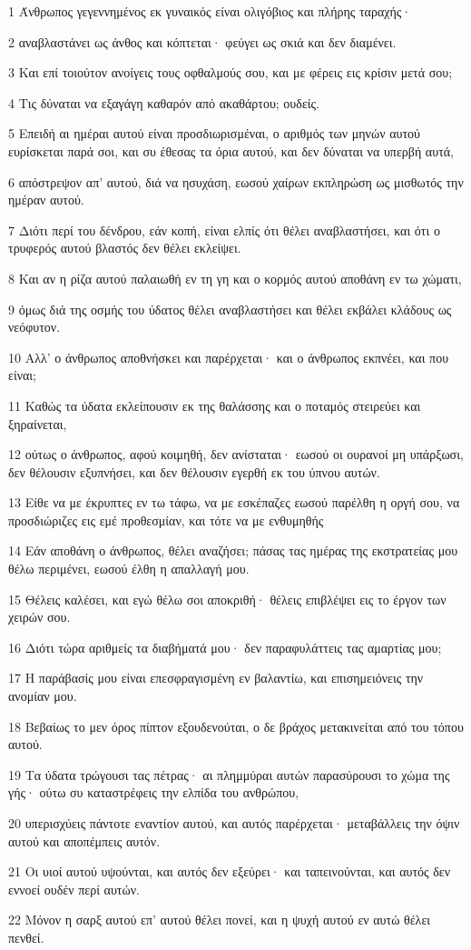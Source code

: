 \par 1 Άνθρωπος γεγεννημένος εκ γυναικός είναι ολιγόβιος και πλήρης ταραχής·
\par 2 αναβλαστάνει ως άνθος και κόπτεται· φεύγει ως σκιά και δεν διαμένει.
\par 3 Και επί τοιούτον ανοίγεις τους οφθαλμούς σου, και με φέρεις εις κρίσιν μετά σου;
\par 4 Τις δύναται να εξαγάγη καθαρόν από ακαθάρτου; ουδείς.
\par 5 Επειδή αι ημέραι αυτού είναι προσδιωρισμέναι, ο αριθμός των μηνών αυτού ευρίσκεται παρά σοι, και συ έθεσας τα όρια αυτού, και δεν δύναται να υπερβή αυτά,
\par 6 απόστρεψον απ' αυτού, διά να ησυχάση, εωσού χαίρων εκπληρώση ως μισθωτός την ημέραν αυτού.
\par 7 Διότι περί του δένδρου, εάν κοπή, είναι ελπίς ότι θέλει αναβλαστήσει, και ότι ο τρυφερός αυτού βλαστός δεν θέλει εκλείψει.
\par 8 Και αν η ρίζα αυτού παλαιωθή εν τη γη και ο κορμός αυτού αποθάνη εν τω χώματι,
\par 9 όμως διά της οσμής του ύδατος θέλει αναβλαστήσει και θέλει εκβάλει κλάδους ως νεόφυτον.
\par 10 Αλλ' ο άνθρωπος αποθνήσκει και παρέρχεται· και ο άνθρωπος εκπνέει, και που είναι;
\par 11 Καθώς τα ύδατα εκλείπουσιν εκ της θαλάσσης και ο ποταμός στειρεύει και ξηραίνεται,
\par 12 ούτως ο άνθρωπος, αφού κοιμηθή, δεν ανίσταται· εωσού οι ουρανοί μη υπάρξωσι, δεν θέλουσιν εξυπνήσει, και δεν θέλουσιν εγερθή εκ του ύπνου αυτών.
\par 13 Είθε να με έκρυπτες εν τω τάφω, να με εσκέπαζες εωσού παρέλθη η οργή σου, να προσδιώριζες εις εμέ προθεσμίαν, και τότε να με ενθυμηθής
\par 14 Εάν αποθάνη ο άνθρωπος, θέλει αναζήσει; πάσας τας ημέρας της εκστρατείας μου θέλω περιμένει, εωσού έλθη η απαλλαγή μου.
\par 15 Θέλεις καλέσει, και εγώ θέλω σοι αποκριθή· θέλεις επιβλέψει εις το έργον των χειρών σου.
\par 16 Διότι τώρα αριθμείς τα διαβήματά μου· δεν παραφυλάττεις τας αμαρτίας μου;
\par 17 Η παράβασίς μου είναι επεσφραγισμένη εν βαλαντίω, και επισημειόνεις την ανομίαν μου.
\par 18 Βεβαίως το μεν όρος πίπτον εξουδενούται, ο δε βράχος μετακινείται από του τόπου αυτού.
\par 19 Τα ύδατα τρώγουσι τας πέτρας· αι πλημμύραι αυτών παρασύρουσι το χώμα της γής· ούτω συ καταστρέφεις την ελπίδα του ανθρώπου,
\par 20 υπερισχύεις πάντοτε εναντίον αυτού, και αυτός παρέρχεται· μεταβάλλεις την όψιν αυτού και αποπέμπεις αυτόν.
\par 21 Οι υιοί αυτού υψούνται, και αυτός δεν εξεύρει· και ταπεινούνται, και αυτός δεν εννοεί ουδέν περί αυτών.
\par 22 Μόνον η σαρξ αυτού επ' αυτού θέλει πονεί, και η ψυχή αυτού εν αυτώ θέλει πενθεί.

